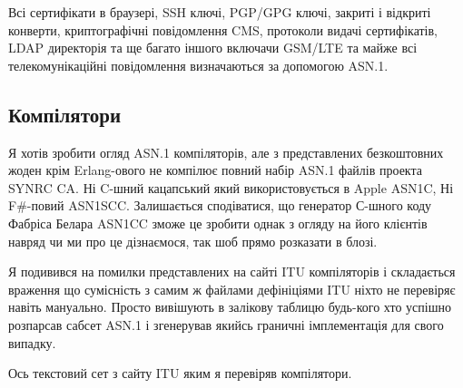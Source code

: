 Всі сертифікати в браузері, SSH ключі, PGP/GPG ключі, закриті і відкриті конверти, криптографічні повідомлення CMS, протоколи видачі сертифікатів, LDAP директорія та ще багато іншого включачи GSM/LTE та майже всі телекомунікаційні повідомлення визначаються за допомогою ASN.1.

\subsection{Компілятори}

Я хотів зробити огляд ASN.1 компіляторів, але з представлених безкоштовних жоден крім Erlang-ового не компілює повний набір ASN.1 файлів проекта SYNRC CA. Ні C-шний кацапський який використовується в Apple ASN1C, Ні F#-повий ASN1SCC. Залишається сподіватися, що генератор С-шного коду Фабріса Белара ASN1CC зможе це зробити однак з огляду на його клієнтів навряд чи ми про це дізнаємося, так шоб прямо розказати в блозі.

Я подивився на помилки представлених на сайті ITU компіляторів і складається враження що сумісність з самим ж файлами дефініціями ITU ніхто не перевіряє навіть мануально. Просто вивішують в залікову таблицю будь-кого хто успішно розпарсав сабсет ASN.1 і згенерував якийсь граничні імплементація для свого випадку.


Ось текстовий сет з сайту ITU яким я перевіряв компілятори.

\renewcommand{\footnotesize}{\tiny}


